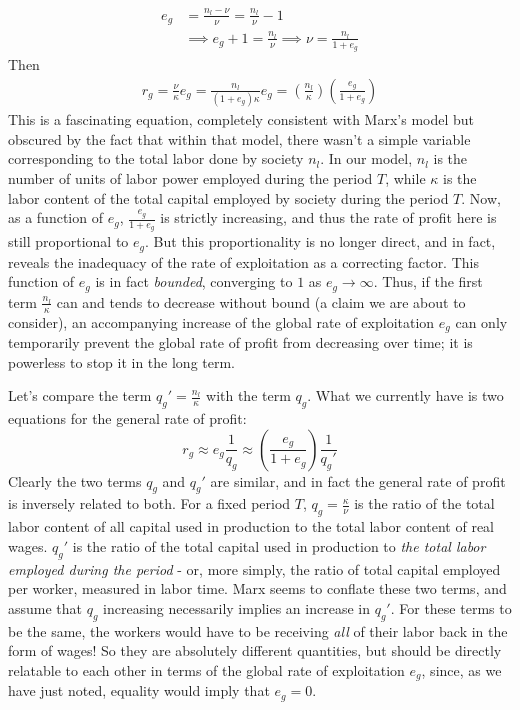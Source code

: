\begin{align}
	e_g &= \frac{n_l-\nu}{\nu} = \frac{n_l}{\nu}-1  \\
	&\implies e_g+1 = \frac{n_l}{\nu} \implies \nu = \frac{n_l}{1+e_g} 
\end{align}
Then 
\begin{align}
	r_g = \frac{\nu}{\kappa}e_g = \frac{n_l}{(1+e_g)\kappa}e_g = \left(\frac{n_l}{\kappa}\right) \left(\frac{e_g}{1+e_g} \right)
\end{align}
This is a fascinating equation, completely consistent with Marx's model but obscured by the fact that within that model, there wasn't a simple variable corresponding to the total labor done by society $n_l$. In our model, $n_l$ is the number of units of labor power employed during the period $T$, while $\kappa$ is the labor content of the total capital employed by society during the period $T$. Now, as a function of $e_g$, $\frac{e_g}{1+e_g}$ is strictly increasing, and thus the rate of profit here is still proportional to $e_g$. But this proportionality is no longer direct, and in fact, reveals the inadequacy of the rate of exploitation as a correcting factor. This function of $e_g$ is in fact \textit{bounded}, converging to $1$ as $e_g \to \infty$. Thus, if the first term $\frac{n_l}{\kappa}$ can and tends to decrease without bound (a claim we are about to consider), an accompanying increase of the global rate of exploitation $e_g$ can only temporarily prevent the global rate of profit from decreasing over time; it is powerless to stop it in the long term. \par 
Let's compare the term $q_g' = \frac{n_l}{\kappa}$ with the term $q_g$. What we currently have is two equations for the general rate of profit:
\[ r_g \approx e_g\frac{1}{q_g} \approx \left(\frac{e_g}{1+e_g}\right)\frac{1}{q_g'} \]
Clearly the two terms $q_g$ and $q_g'$ are similar, and in fact the general rate of profit is inversely related to both. For a fixed period $T$, $q_g = \frac{\kappa}{\nu}$ is the ratio of the total labor content of all capital used in production to the total labor content of real wages. $q_g'$ is the ratio of the total capital used in production to \textit{the total labor employed during the period} - or, more simply, the ratio of total capital employed per worker, measured in labor time. Marx seems to conflate these two terms, and assume that $q_g$ increasing necessarily implies an increase in $q_g'$. For these terms to be the same, the workers would have to be receiving \textit{all} of their labor back in the form of wages! So they are absolutely different quantities, but should be directly relatable to each other in terms of the global rate of exploitation $e_g$, since, as we have just noted, equality would imply that $e_g = 0$. \par 
